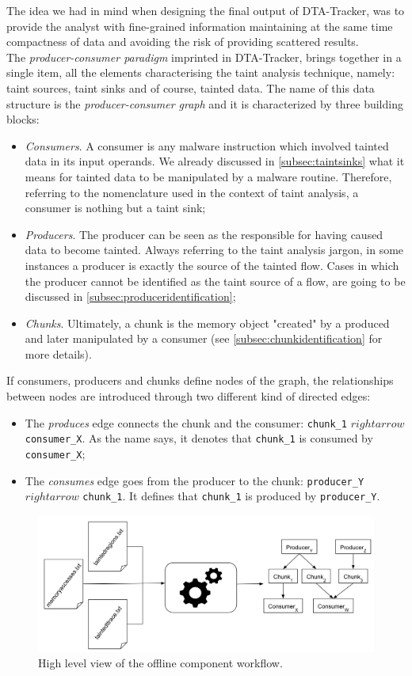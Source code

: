 \documentclass[LaM,binding=0.6cm]{sapthesis}
\begin{document}
The idea we had in mind when designing the final output of DTA-Tracker, was to provide the analyst with fine-grained information maintaining at the same time compactness of data and avoiding the risk of providing scattered results.\\
The \textit{producer-consumer paradigm} imprinted in DTA-Tracker, brings together in a single item, all the elements characterising the taint analysis technique, namely: taint sources, taint sinks and of course, tainted data. The name of this data structure is the \textit{producer-consumer graph} and it is characterized by three building blocks:
\begin{itemize}
\item \textit{Consumers}. A consumer is any malware instruction which involved tainted data in its input operands. We already discussed in \autoref{subsec:taintsinks} what it means for tainted data to be manipulated by a malware routine. Therefore, referring to the nomenclature used in the context of taint analysis, a consumer is nothing but a taint sink;
\item \textit{Producers}. The producer can be seen as the responsible for having caused data to become tainted. Always referring to the taint analysis jargon, in some instances a producer is exactly the source of the tainted flow. Cases in which the producer cannot be identified as the taint source of a flow, are going to be discussed in \autoref{subsec:produceridentification};
\item \textit{Chunks}. Ultimately, a chunk is the memory object "created" by a produced and later manipulated by a consumer (see \autoref{subsec:chunkidentification} for more details). 
\end{itemize}
If consumers, producers and chunks define nodes of the graph, the relationships between nodes are introduced through two different kind of directed edges:
\begin{itemize}
\item The \textit{produces} edge connects the chunk and the consumer: \texttt{chunk\_1} $rightarrow$ \texttt{consumer\_X}. As the name says, it denotes that \texttt{chunk\_1}  is consumed by \texttt{consumer\_X};
\item The \textit{consumes} edge goes from the producer to the chunk: \texttt{producer\_Y} $rightarrow$ \texttt{chunk\_1}. It defines that \texttt{chunk\_1} is produced by \texttt{producer\_Y}.
\end{itemize}

\begin{figure}[h!]
\centering
\includegraphics[scale=.45]{images/dtatracker3}
\caption{High level view of the offline component workflow.}
\end{figure}
\end{document}
